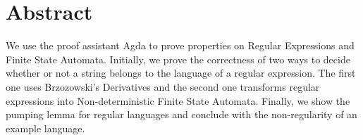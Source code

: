 \documentclass[12pt]{book}
\begin{document}


\clearpage
\newpage
\thispagestyle{empty}

\cleardoublepage

\thispagestyle{empty}
\section*{Abstract}
We use the proof assistant Agda to prove properties on Regular Expressions and Finite State Automata. Initially, we prove the correctness of two ways to decide whether or not a string belongs to the language of a regular expression. The first one uses Brzozowski's Derivatives and the second one transforms regular expressions into Non-deterministic Finite State Automata. Finally, we show the pumping lemma for regular languages and conclude with the non-regularity of an example language.
\thispagestyle{empty}
\restoregeometry   


\thispagestyle{empty}
\tableofcontents
\thispagestyle{empty}

\newpage
\thispagestyle{empty}
\clearpage\null\newpage
\newpage
\thispagestyle{empty}
\clearpage\null\newpage

\thispagestyle{empty}

\setcounter{page}{1}









\end{document}

